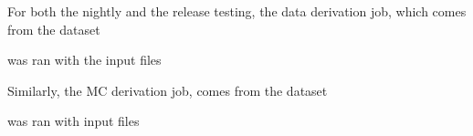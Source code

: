\label{app: deriv job dataset}


For both the nightly and the release testing, the data derivation job, which comes from the dataset 



was ran with the input files 



Similarly, the MC derivation job, comes from the dataset 



was ran with input files


